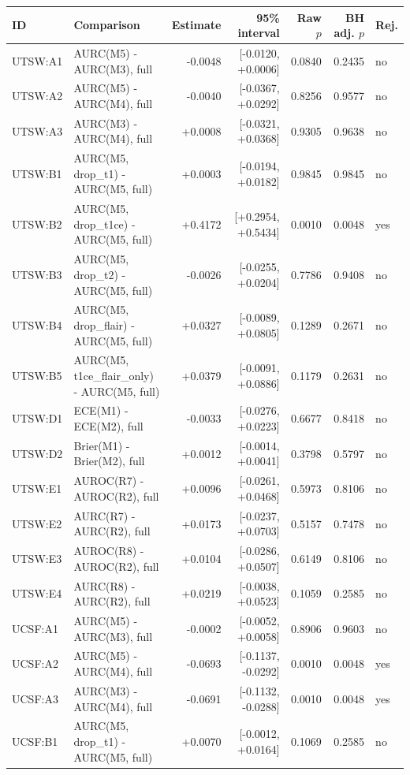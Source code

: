 \begin{tabular}{llrrrrl}
\toprule
ID & Comparison & Estimate & 95\% interval & Raw $p$ & BH adj. $p$ & Rej. \\
\midrule
UTSW:A1 & AURC(M5) - AURC(M3), full & -0.0048 & [-0.0120, +0.0006] & 0.0840 & 0.2435 & no \\
UTSW:A2 & AURC(M5) - AURC(M4), full & -0.0040 & [-0.0367, +0.0292] & 0.8256 & 0.9577 & no \\
UTSW:A3 & AURC(M3) - AURC(M4), full & +0.0008 & [-0.0321, +0.0368] & 0.9305 & 0.9638 & no \\
UTSW:B1 & AURC(M5, drop\_t1) - AURC(M5, full) & +0.0003 & [-0.0194, +0.0182] & 0.9845 & 0.9845 & no \\
UTSW:B2 & AURC(M5, drop\_t1ce) - AURC(M5, full) & +0.4172 & [+0.2954, +0.5434] & 0.0010 & 0.0048 & yes \\
UTSW:B3 & AURC(M5, drop\_t2) - AURC(M5, full) & -0.0026 & [-0.0255, +0.0204] & 0.7786 & 0.9408 & no \\
UTSW:B4 & AURC(M5, drop\_flair) - AURC(M5, full) & +0.0327 & [-0.0089, +0.0805] & 0.1289 & 0.2671 & no \\
UTSW:B5 & AURC(M5, t1ce\_flair\_only) - AURC(M5, full) & +0.0379 & [-0.0091, +0.0886] & 0.1179 & 0.2631 & no \\
UTSW:D1 & ECE(M1) - ECE(M2), full & -0.0033 & [-0.0276, +0.0223] & 0.6677 & 0.8418 & no \\
UTSW:D2 & Brier(M1) - Brier(M2), full & +0.0012 & [-0.0014, +0.0041] & 0.3798 & 0.5797 & no \\
UTSW:E1 & AUROC(R7) - AUROC(R2), full & +0.0096 & [-0.0261, +0.0468] & 0.5973 & 0.8106 & no \\
UTSW:E2 & AURC(R7) - AURC(R2), full & +0.0173 & [-0.0237, +0.0703] & 0.5157 & 0.7478 & no \\
UTSW:E3 & AUROC(R8) - AUROC(R2), full & +0.0104 & [-0.0286, +0.0507] & 0.6149 & 0.8106 & no \\
UTSW:E4 & AURC(R8) - AURC(R2), full & +0.0219 & [-0.0038, +0.0523] & 0.1059 & 0.2585 & no \\
UCSF:A1 & AURC(M5) - AURC(M3), full & -0.0002 & [-0.0052, +0.0058] & 0.8906 & 0.9603 & no \\
UCSF:A2 & AURC(M5) - AURC(M4), full & -0.0693 & [-0.1137, -0.0292] & 0.0010 & 0.0048 & yes \\
UCSF:A3 & AURC(M3) - AURC(M4), full & -0.0691 & [-0.1132, -0.0288] & 0.0010 & 0.0048 & yes \\
UCSF:B1 & AURC(M5, drop\_t1) - AURC(M5, full) & +0.0070 & [-0.0012, +0.0164] & 0.1069 & 0.2585 & no \\

\end{tabular}
